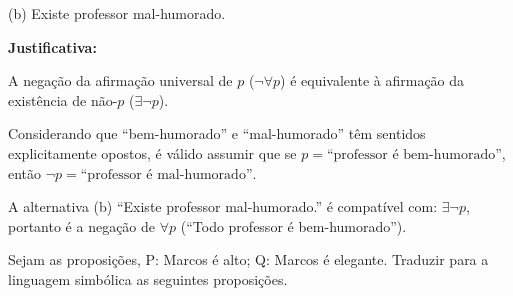 \documentclass[12pt,letterpaper, onecolumn]{exam}
\begin{document}
\begin{questions}
    
    \begin{solution}
        (b) Existe professor mal-humorado.

        \textbf{Justificativa:}
        
        A negação da afirmação universal de \(p\) (\( \neg \forall p \)) é equivalente à afirmação da existência de não-\(p\) (\( \exists \neg p \)).

       Considerando que “bem-humorado” e “mal-humorado” têm sentidos explicitamente opostos, é válido assumir que se \(p = \text{“professor é bem-humorado”} \), então \( \neg p = \text{“professor é mal-humorado”} \).

        A alternativa (b) “Existe professor mal-humorado.” é compatível com: \( \exists \neg p \), portanto é a negação de \(\forall p\) (“Todo professor é bem-humorado”).
        
    \end{solution}

    \question[q3] Sejam as proposições, P: Marcos é alto; Q: Marcos é elegante. Traduzir para a linguagem simbólica as seguintes proposições. 
    
\end{questions}
\end{document}
